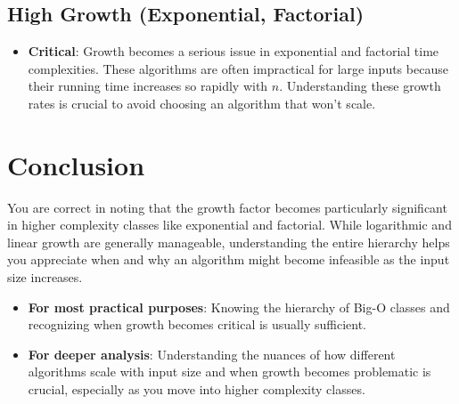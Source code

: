 \documentclass{article}
\begin{document}
\subsection{High Growth (Exponential, Factorial)}
\begin{itemize}
    \item \textbf{Critical}: Growth becomes a serious issue in exponential and factorial time complexities. These algorithms are often impractical for large inputs because their running time increases so rapidly with \( n \). Understanding these growth rates is crucial to avoid choosing an algorithm that won't scale.
\end{itemize}

\section{Conclusion}

You are correct in noting that the growth factor becomes particularly significant in higher complexity classes like exponential and factorial. While logarithmic and linear growth are generally manageable, understanding the entire hierarchy helps you appreciate when and why an algorithm might become infeasible as the input size increases.

\begin{itemize}
    \item \textbf{For most practical purposes}: Knowing the hierarchy of Big-O classes and recognizing when growth becomes critical is usually sufficient.
    \item \textbf{For deeper analysis}: Understanding the nuances of how different algorithms scale with input size and when growth becomes problematic is crucial, especially as you move into higher complexity classes.
\end{itemize}
\end{document}

